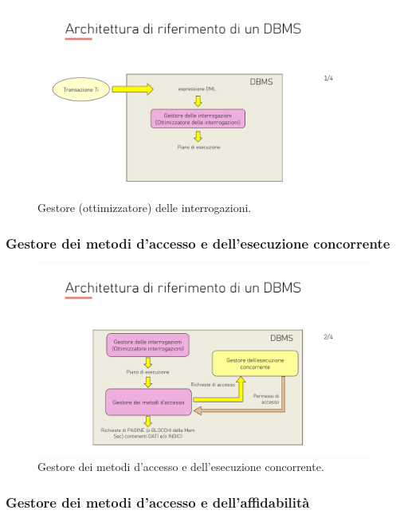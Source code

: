 \documentclass[a4paper]{article}
\begin{document}
	\begin{figure}[!htp]
		\centering
		\includegraphics[width=\textwidth]{img/gestore_interrogazioni.pdf}
		\caption{Gestore (ottimizzatore) delle interrogazioni.}
	\end{figure}

	\subsubsection{Gestore dei metodi d'accesso e dell'esecuzione concorrente}
	
	\begin{figure}[!htp]
		\centering
		\includegraphics[width=\textwidth]{img/gestore_metodi_accesso_e_esecuzione.pdf}
		\caption{Gestore dei metodi d'accesso e dell'esecuzione concorrente.}
	\end{figure}\newpage

	\subsubsection{Gestore dei metodi d'accesso e dell'affidabilità}
	
\end{document}
